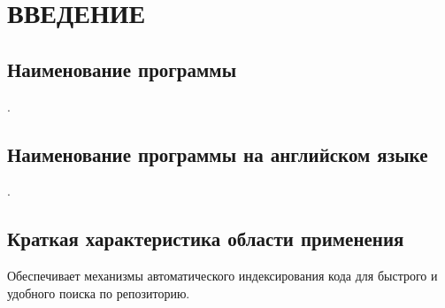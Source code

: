 \section{ВВЕДЕНИЕ}

\noindent\subsection{Наименование программы}
    \docTitle.
    
\noindent\subsection{Наименование программы на английском языке}
    \docTitleEng.

\noindent\subsection{Краткая характеристика области применения}
	Обеспечивает механизмы автоматического индексирования кода для быстрого и удобного поиска по репозиторию.

\clearpage

